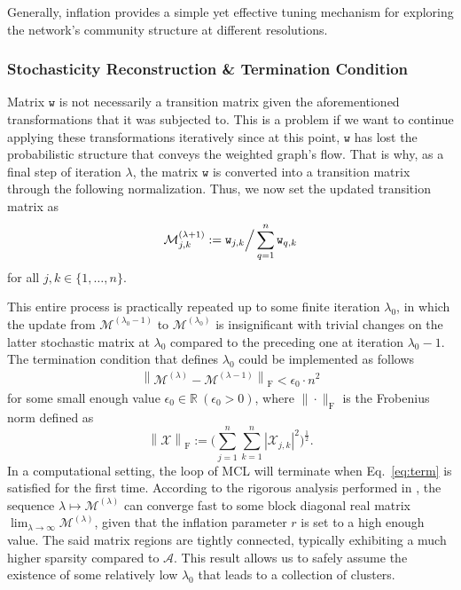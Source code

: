 Generally, inflation provides a simple yet effective tuning mechanism for exploring the network's community structure at different resolutions.

\subsubsection[Stochasticity Reconstruction \& \ Termination Condition]{Stochasticity Reconstruction \& Termination Condition}

Matrix \(\texttt{w}\) is not necessarily a transition matrix given the aforementioned transformations that it was subjected to.
This is a problem if we want to continue applying these transformations iteratively since at this point, \(\texttt{w}\) has lost the probabilistic structure that conveys the weighted graph's flow.
That is why, as a final step of iteration \(\lambda\), the matrix \(\texttt{w}\) is converted into a transition matrix through the following normalization. Thus, we now set the updated transition matrix as
\begin{align*}
  \mathcal{M}^{(\lambda+1)}_{j,k} := \texttt{w}_{j,k} \Big{/} \sum_{q=1}^{n} \texttt{w}_{q,k}
\end{align*}
for all \(j,k \in \{ 1, \dots, n \}\).

This entire process is practically repeated up to some finite iteration \(\lambda_0\), in which the update from \(\mathcal{M}^{(\lambda_0-1)}\) to \(\mathcal{M}^{(\lambda_0)}\) is insignificant with trivial changes on the latter stochastic matrix at \(\lambda_0\) compared to the preceding one at iteration \(\lambda_0-1\). The termination condition that defines \(\lambda_0\) could be implemented as follows
\begin{align}
  \left\| \mathcal{M}^{(\lambda)} - \mathcal{M}^{(\lambda-1)} \right\|_\text{F} < \epsilon_0 \cdot n^2
  \label{eq:term}
\end{align}
for some small enough value \(\epsilon_0 \in \mathbb{R} \ ( \epsilon_0 > 0)\), where \(\| \cdot \|_\text{F}\) is the Frobenius norm defined as
\[
  \left\| \mathcal{X} \right\|_\text{F} := \Bigg( \sum_{j=1}^{n} \sum_{k=1}^{n} \left| \mathcal{X}_{j,k} \right|^2 \Bigg)^{\frac{1}{2}}.
\]
In a computational setting, the loop of MCL will terminate when Eq.~\ref{eq:term} is satisfied for the first time.
According to the rigorous analysis performed in \cite{mclDetailed}, the
sequence \(\lambda \mapsto \mathcal{M}^{(\lambda)}\) can converge fast to some
block diagonal real matrix \(\lim_{\lambda \rightarrow \infty}
\mathcal{M}^{(\lambda)}\), given that the inflation parameter \(r\) is set to a
high enough value. The said matrix regions are tightly connected, typically
exhibiting a much higher sparsity compared to \(\mathcal{A}\). This result
allows us to safely assume the existence of some relatively low \(\lambda_0\)
that leads to a collection of clusters.

